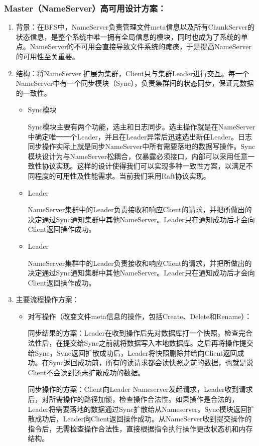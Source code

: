 \documentclass{ctexart}
\begin{document}
\subsubsection{Master（NameServer）高可用设计方案：}
\begin{enumerate}
	\item 背景：在BFS中，NameServer负责管理文件meta信息以及所有ChunkServer的状态信息，是整个系统中唯一拥有全局信息的模块，同时也成为了系统的单点。NameServer的不可用会直接导致文件系统的瘫痪，于是提高NameServer的可用性至关重要。
	\item 结构：将NameServer 扩展为集群，Client只与集群Leader进行交互。每一个NameServer中有一个同步模块（Sync），负责集群间的状态同步，保证元数据的一致性。
	\begin{itemize}
		\item Sync模块
		
		Sync模块主要有两个功能，选主和日志同步。选主操作就是在NameServer中确定唯一一个Leader，并且在Leader异常后迅速选出新任Leader。日志同步操作实际上就是同步NameServer中所有需要落地的数据写操作。Sync模块设计为与NameServer松耦合，仅暴露必须接口，内部可以采用任意一致性协议实现。这样的设计使得我们可以实现多种一致性方案，以满足不同程度的可用性及性能需求。当前我们采用Raft协议实现。
		\item Leader
		
		NameServer集群中的Leader负责接收和响应Client的请求，并把所做出的决定通过Sync通知集群中其他NameServer。Leader只在通知成功后才会向Client返回操作成功。
		\item Leader
		
		NameServer集群中的Leader负责接收和响应Client的请求，并把所做出的决定通过Sync通知集群中其他NameServer。Leader只在通知成功后才会向Client返回操作成功。
	\end{itemize}
	\item 主要流程操作方案：
	\begin{itemize}
		\item 对写操作（改变文件meta信息的操作，包括Create、Delete和Rename）：
		
		同步结果的方案：Leader在收到操作后先对数据库打一个快照，检查完合法性后，在提交给Sync之前就将数据写入本地数据库。之后再将操作提交给Sync，Sync返回扩散成功后，Leader将快照删除并给向Client返回成功。在Sync返回成功前，所有的读请求都会读快照之前的数据，也就是说Client不会读到还未扩散成功的数据。
		
		同步操作的方案：Client向Leader Nameserver发起请求，Leader收到请求后，对所需操作的路径加锁，检查操作合法性。如果操作是合法的，Leader将需要落地的数据通过Sync扩散给从Nameserver。Sync模块返回扩散成功后，Leader向Client返回操作成功。从NameServer收到提交操作的指令后，无需检查操作合法性，直接根据指令执行操作更改状态机和内存结构。
		

\end{itemize}
\end{enumerate}
\end{document}
